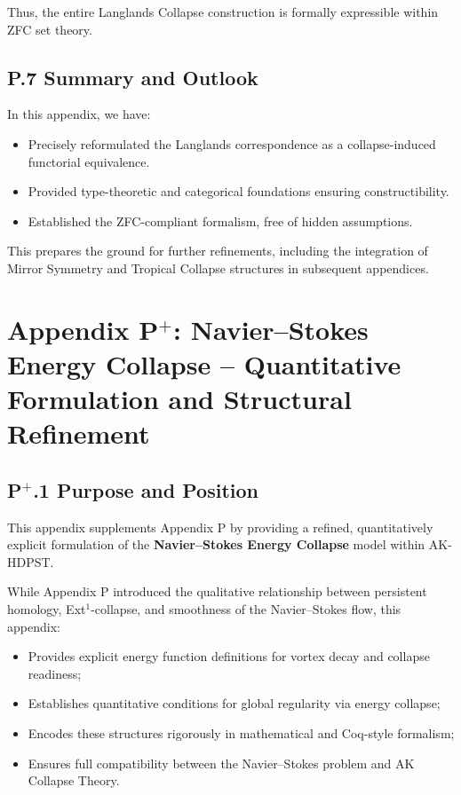 \documentclass[11pt]{article}
\begin{document}
Thus, the entire Langlands Collapse construction is formally expressible within ZFC set theory.

\subsection*{P.7 Summary and Outlook}

In this appendix, we have:

\begin{itemize}
  \item Precisely reformulated the Langlands correspondence as a collapse-induced functorial equivalence.
  \item Provided type-theoretic and categorical foundations ensuring constructibility.
  \item Established the ZFC-compliant formalism, free of hidden assumptions.
\end{itemize}

This prepares the ground for further refinements, including the integration of Mirror Symmetry and Tropical Collapse structures in subsequent appendices.




\section*{Appendix P$^{+}$: Navier–Stokes Energy Collapse – Quantitative Formulation and Structural Refinement}

\subsection*{P$^{+}$.1 Purpose and Position}

This appendix supplements Appendix P by providing a refined, quantitatively explicit formulation of the \textbf{Navier–Stokes Energy Collapse} model within AK-HDPST.

While Appendix P introduced the qualitative relationship between persistent homology, Ext$^1$-collapse, and smoothness of the Navier–Stokes flow, this appendix:

\begin{itemize}
    \item Provides explicit energy function definitions for vortex decay and collapse readiness;
    \item Establishes quantitative conditions for global regularity via energy collapse;
    \item Encodes these structures rigorously in mathematical and Coq-style formalism;
    \item Ensures full compatibility between the Navier–Stokes problem and AK Collapse Theory.
\end{itemize}
\end{document}
